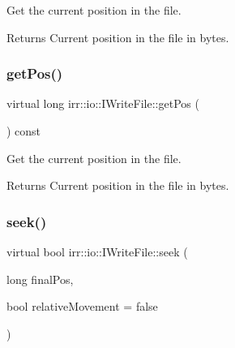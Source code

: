 Get the current position in the file. 

\begin{DoxyReturn}{Returns}
Current position in the file in bytes. 
\end{DoxyReturn}
\mbox{\label{classirr_1_1io_1_1IWriteFile_a062eaf082b6f4d05cf0e44b85aa7a6ab}} 
\subsubsection{\texorpdfstring{get\+Pos()}{getPos()}\hspace{0.1cm}{\footnotesize\ttfamily [2/2]}}
{\footnotesize\ttfamily virtual long irr\+::io\+::\+I\+Write\+File\+::get\+Pos (\begin{DoxyParamCaption}{ }\end{DoxyParamCaption}) const\hspace{0.3cm}{\ttfamily [pure virtual]}}



Get the current position in the file. 

\begin{DoxyReturn}{Returns}
Current position in the file in bytes. 
\end{DoxyReturn}
\mbox{\label{classirr_1_1io_1_1IWriteFile_ad68289024b2a2079fce20ca9b95c9519}} 
\subsubsection{\texorpdfstring{seek()}{seek()}\hspace{0.1cm}{\footnotesize\ttfamily [1/2]}}
{\footnotesize\ttfamily virtual bool irr\+::io\+::\+I\+Write\+File\+::seek (\begin{DoxyParamCaption}\item[{long}]{final\+Pos,  }\item[{bool}]{relative\+Movement = {\ttfamily false} }\end{DoxyParamCaption})\hspace{0.3cm}{\ttfamily [pure virtual]}}



